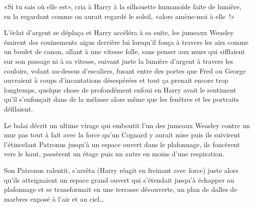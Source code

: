 «Si tu sais où elle est», cria à Harry à la silhouette humanoïde faite de lumière, en la regardant comme on aurait regardé le soleil, «alors amène-moi à elle~!»

L'éclat d'argent se déplaça et Harry accéléra à sa suite, les jumeaux Weasley émirent des couinements aigus derrière lui lorsqu'il fonça à travers les airs comme un boulet de canon, allant à une vitesse folle, sans penser aux murs qui sifflaient sur son passage ni à sa vitesse, suivant juste la lumière d'argent à travers les couloirs, volant au-dessus d'escaliers, fusant entre des portes que Fred ou George ouvraient à coups d'incantations désespérées et tout ça prenait encore trop longtemps, quelque chose de profondément enfoui en Harry avait le sentiment qu'il s'enfonçait dans de la mélasse alors même que les fenêtres et les portraits défilaient.

Le balai décrit un ultime virage qui emboutit l'un des jumeaux Weasley contre un mur pas tout à fait avec la force qu'un Cognard y aurait mise puis ils suivirent l'étincelant Patronus jusqu'à un espace ouvert dans le plafonnage, ils foncèrent vers le haut, passèrent un étage puis un autre en moins d'une respiration.

Son Patronus ralentit, s'arrêta (Harry réagit en freinant avec force) juste alors qu'ils atteignaient un espace grand ouvert qui s'étendait jusqu'à échapper au plafonnage et se transformait en une terrasse découverte, un plan de dalles de marbres exposé à l'air et au ciel…
